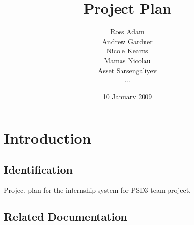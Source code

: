 \documentclass{l3deliverable}
\title{Project Plan}
\author{
  Ross Adam \\
  Andrew Gardner \\
  Nicole Kearns \\
  Mamas Nicolau \\
  Asset Sarsengaliyev \\
  ...}
\date{10 January 2009}
\begin{document}

\maketitle

\tableofcontents

\newpage


\section{Introduction}

\subsection{Identification}

Project plan for the internship system for PSD3 team project.

\subsection{Related Documentation}
\end{document}
